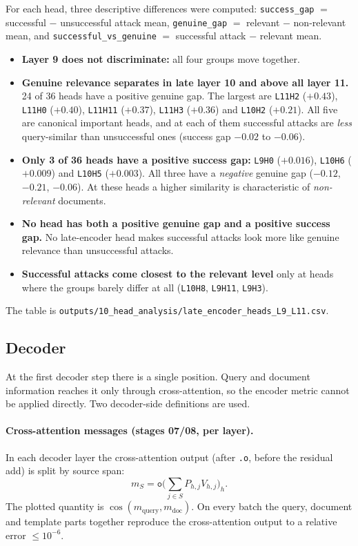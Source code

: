 \documentclass[11pt]{article}
\begin{document}
For each head, three descriptive differences were computed:
\texttt{success\_gap} $=$ successful $-$ unsuccessful attack mean,
\texttt{genuine\_gap} $=$ relevant $-$ non-relevant mean, and
\texttt{successful\_vs\_genuine} $=$ successful attack $-$ relevant mean.

\begin{itemize}[nosep]
  \item \textbf{Layer 9 does not discriminate:} all four groups move together.
  \item \textbf{Genuine relevance separates in late layer 10 and above all layer 11.}
        24 of 36 heads have a positive genuine gap. The largest are \texttt{L11H2}
        ($+0.43$), \texttt{L11H0} ($+0.40$), \texttt{L11H11} ($+0.37$),
        \texttt{L11H3} ($+0.36$) and \texttt{L10H2} ($+0.21$). All five are canonical
        important heads, and at each of them successful attacks are \emph{less}
        query-similar than unsuccessful ones (success gap $-0.02$ to $-0.06$).
  \item \textbf{Only 3 of 36 heads have a positive success gap:} \texttt{L9H0}
        ($+0.016$), \texttt{L10H6} ($+0.009$) and \texttt{L10H5} ($+0.003$). All three
        have a \emph{negative} genuine gap ($-0.12$, $-0.21$, $-0.06$). At these heads a
        higher similarity is characteristic of \emph{non-relevant} documents.
  \item \textbf{No head has both a positive genuine gap and a positive success gap.}
        No late-encoder head makes successful attacks look more like genuine relevance
        than unsuccessful attacks.
  \item \textbf{Successful attacks come closest to the relevant level} only at heads
        where the groups barely differ at all (\texttt{L10H8}, \texttt{L9H11},
        \texttt{L9H3}).
\end{itemize}

The table is \texttt{outputs/10\_head\_analysis/late\_encoder\_heads\_L9\_L11.csv}.

\subsection{Decoder}

At the first decoder step there is a single position. Query and document information
reaches it only through cross-attention, so the encoder metric cannot be applied
directly. Two decoder-side definitions are used.

\paragraph{Cross-attention messages (stages 07/08, per layer).} In each decoder layer the
cross-attention output (after \texttt{.o}, before the residual add) is split by source
span:
\[
m_S=\texttt{o}\Big(\textstyle\sum_{j\in S}P_{h,j}V_{h,j}\Big)_h .
\]
The plotted quantity is $\cos(m_{\mathrm{query}},m_{\mathrm{doc}})$. On every batch the
query, document and template parts together reproduce the cross-attention output to a
relative error $\le10^{-6}$.
\end{document}
